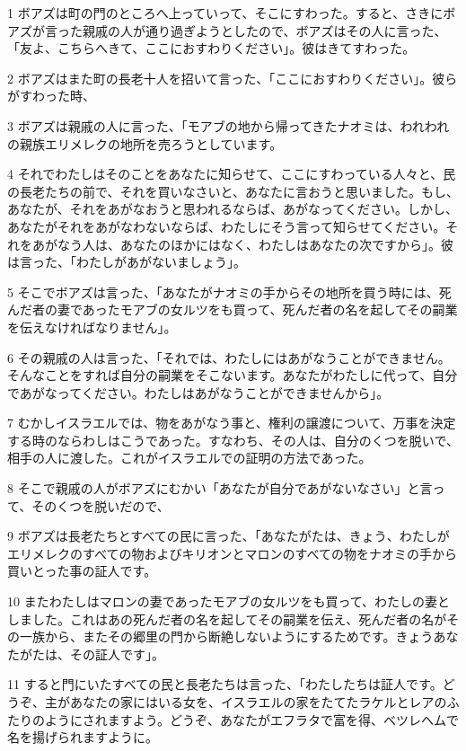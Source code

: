 \par 1 ボアズは町の門のところへ上っていって、そこにすわった。すると、さきにボアズが言った親戚の人が通り過ぎようとしたので、ボアズはその人に言った、「友よ、こちらへきて、ここにおすわりください」。彼はきてすわった。
\par 2 ボアズはまた町の長老十人を招いて言った、「ここにおすわりください」。彼らがすわった時、
\par 3 ボアズは親戚の人に言った、「モアブの地から帰ってきたナオミは、われわれの親族エリメレクの地所を売ろうとしています。
\par 4 それでわたしはそのことをあなたに知らせて、ここにすわっている人々と、民の長老たちの前で、それを買いなさいと、あなたに言おうと思いました。もし、あなたが、それをあがなおうと思われるならば、あがなってください。しかし、あなたがそれをあがなわないならば、わたしにそう言って知らせてください。それをあがなう人は、あなたのほかにはなく、わたしはあなたの次ですから」。彼は言った、「わたしがあがないましょう」。
\par 5 そこでボアズは言った、「あなたがナオミの手からその地所を買う時には、死んだ者の妻であったモアブの女ルツをも買って、死んだ者の名を起してその嗣業を伝えなければなりません」。
\par 6 その親戚の人は言った、「それでは、わたしにはあがなうことができません。そんなことをすれば自分の嗣業をそこないます。あなたがわたしに代って、自分であがなってください。わたしはあがなうことができませんから」。
\par 7 むかしイスラエルでは、物をあがなう事と、権利の譲渡について、万事を決定する時のならわしはこうであった。すなわち、その人は、自分のくつを脱いで、相手の人に渡した。これがイスラエルでの証明の方法であった。
\par 8 そこで親戚の人がボアズにむかい「あなたが自分であがないなさい」と言って、そのくつを脱いだので、
\par 9 ボアズは長老たちとすべての民に言った、「あなたがたは、きょう、わたしがエリメレクのすべての物およびキリオンとマロンのすべての物をナオミの手から買いとった事の証人です。
\par 10 またわたしはマロンの妻であったモアブの女ルツをも買って、わたしの妻としました。これはあの死んだ者の名を起してその嗣業を伝え、死んだ者の名がその一族から、またその郷里の門から断絶しないようにするためです。きょうあなたがたは、その証人です」。
\par 11 すると門にいたすべての民と長老たちは言った、「わたしたちは証人です。どうぞ、主があなたの家にはいる女を、イスラエルの家をたてたラケルとレアのふたりのようにされますよう。どうぞ、あなたがエフラタで富を得、ベツレヘムで名を揚げられますように。
